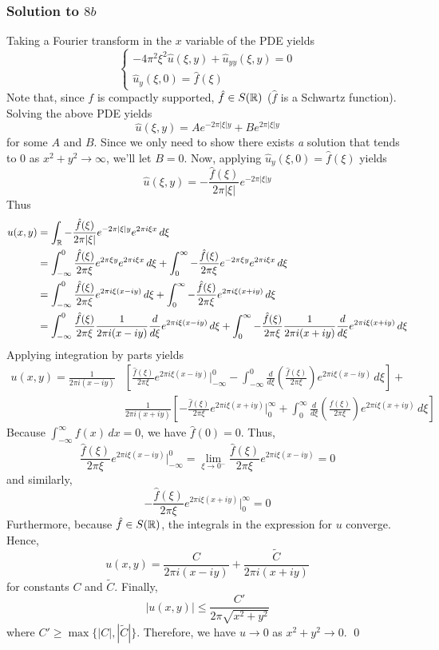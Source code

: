 \subsubsection*{Solution to $8b$}

Taking a Fourier transform in the $x$ variable of the PDE yields
$$
\left\{
\begin{array}{l}
-4\pi^2 \xi^2 \hat{u} (\xi, y) + \hat{u}_{yy}(\xi,y) = 0 \\
\hat{u}_y(\xi,0) = \hat{f}(\xi)
\end{array}
\right.
$$
Note that, since $f$ is compactly supported, $\hat{f} \in S(\mathbb{R})$ ($\hat{f}$ is a Schwartz function). Solving the above PDE yields
$$ \hat{u}(\xi,y) = A e^{-2\pi |\xi| y} + B e^{2 \pi |\xi| y} $$
for some $A$ and $B$. Since we only need to show there exists \emph{a} solution that tends to 0 as $x^2 + y^2 \to \infty$, we'll let $B=0$. Now, applying $\hat{u}_y(\xi,0) = \hat{f}(\xi)$ yields
$$ \hat{u}(\xi,y) = -\frac{\hat{f}(\xi)}{2 \pi |\xi|} e^{-2 \pi |\xi| y} $$
Thus
\begin{align*}
u(x,y) &= \int_{\mathbb{R}} -\frac{\hat{f}(\xi)}{2 \pi |\xi|} e^{-2 \pi |\xi| y} e^{2 \pi i \xi x} \, d\xi \\
&= \int_{-\infty}^0 \frac{\hat{f}(\xi)}{2 \pi \xi} e^{2 \pi \xi y} e^{2 \pi i \xi x} \, d\xi + \int_0^{\infty} -\frac{\hat{f}(\xi)}{2 \pi \xi} e^{-2 \pi \xi y} e^{2 \pi i \xi x} \, d\xi \\
&= \int_{-\infty}^0 \frac{\hat{f}(\xi)}{2 \pi \xi} e^{2 \pi i \xi (x - iy)} \, d\xi + \int_0^{\infty} -\frac{\hat{f}(\xi)}{2 \pi \xi} e^{2 \pi i \xi (x + iy)} \, d\xi \\
&= \int_{-\infty}^0 \frac{\hat{f}(\xi)}{2 \pi \xi} \frac{1}{2 \pi i (x-iy)} \frac{d}{d \xi} e^{2 \pi i \xi (x - iy)} \, d\xi + \int_0^{\infty} -\frac{\hat{f}(\xi)}{2 \pi \xi} \frac{1}{2 \pi i(x+iy)} \frac{d}{d \xi} e^{2 \pi i \xi(x+iy)} \, d\xi
\end{align*}
Applying integration by parts yields
\begin{align*}
 u(x,y) =  \frac{1}{2 \pi i (x-iy)}& \left[\frac{\hat{f}(\xi)}{2 \pi \xi} e^{2 \pi i \xi (x - iy)}  \bigg|_{-\infty}^0 - \int_{-\infty}^0 \frac{d}{d \xi} \left( \frac{\hat{f}(\xi)}{2 \pi \xi} \right) e^{2 \pi i \xi (x - iy)} \, d\xi \right] + \\
&\frac{1}{2 \pi i (x+iy)} \left[-\frac{\hat{f}(\xi)}{2 \pi \xi} e^{2 \pi i \xi (x + iy)}  \bigg|_{0}^{\infty} + \int_{0}^{\infty} \frac{d}{d \xi} \left( \frac{\hat{f}(\xi)}{2 \pi \xi} \right) e^{2 \pi i \xi (x + iy)} \, d\xi \right]
\end{align*}
Because $\int_{-\infty}^{\infty} f(x) \, dx = 0$, we have $\hat{f}(0) = 0$. Thus,
$$ \frac{\hat{f}(\xi)}{2 \pi \xi} e^{2 \pi i \xi (x - iy)}  \bigg|_{-\infty}^0 = \lim_{\xi \to 0^-}\frac{\hat{f}(\xi)}{2 \pi \xi} e^{2 \pi i \xi (x - iy)}  = 0$$
and similarly,
$$ -\frac{\hat{f}(\xi)}{2 \pi \xi} e^{2 \pi i \xi (x + iy)}  \bigg|_{0}^{\infty} = 0 $$
Furthermore, because $\hat{f} \in S(\mathbb{R})$, the integrals in the expression for $u$ converge. Hence,
$$ u(x,y) = \frac{C}{2\pi i(x-iy)} + \frac{\tilde{C}}{2 \pi i(x+iy)} $$
for constants $C$ and $\tilde{C}$. Finally,
$$ |u(x,y)| \leq \frac{C'}{2 \pi \sqrt{x^2 + y^2}} $$
where $C' \geq \max\{ |C|, |\tilde{C}|\}$. Therefore, we have $u \to 0$ as $x^2 + y^2 \to 0$. \hfill \qed
